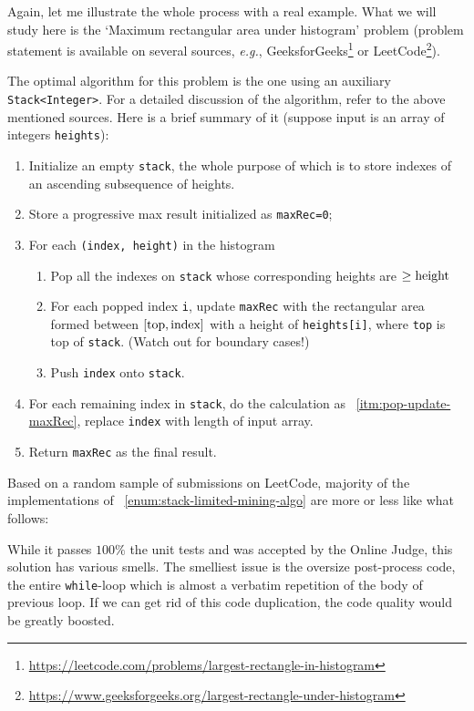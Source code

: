 \documentclass[oneside,11pt]{book}
\theoremstyle{definition}
\theoremstyle{remark}
\newcommand{\code}[1]{\mbox{\lstinline{#1}}}
\begin{document}
Again, let me illustrate the whole process with a real example.
What we will study here is the `Maximum rectangular area under
histogram' problem (problem statement is available on several sources, \textit{e.g.},
GeeksforGeeks\footnote{\url{https://leetcode.com/problems/largest-rectangle-in-histogram}}
or LeetCode\footnote{\url{https://www.geeksforgeeks.org/largest-rectangle-under-histogram}}).

The optimal algorithm for this problem is the one using an auxiliary \code{Stack<Integer>}.
For a detailed discussion of the algorithm, refer to the above mentioned sources.
Here is a brief summary of it (suppose input is an array of integers \code{heights}):
\begin{alisting}[H]
    \caption{\label{enum:stack-limited-mining-algo}Stack-based algorithm for
    the `maximum rectangular area under histogram' problem}
    \begin{enumerate}
        \item Initialize an empty \code{stack}, the whole purpose of
        which is to store indexes of an ascending subsequence of heights.
        \item Store a progressive max result initialized as \code{maxRec=0};
        \item For each \code{(index, height)} in the histogram
        \begin{enumerate}
            \item Pop all the indexes on \code{stack} whose corresponding heights are
            $\geq \mbox{\code{height}}$
            \item For each popped index \code{i}, update \code{maxRec} with the
            rectangular area formed between $[\mbox{\code{top}}, \mbox{\code{index}}]$
            with a height of \code{heights[i]}, where \code{top} is top of \code{stack}.
            (Watch out for boundary cases!) \label{itm:pop-update-maxRec}
            \item Push \code{index} onto \code{stack}.
        \end{enumerate}
        \item For each remaining index in \code{stack}, do the calculation
        as ~\ref{itm:pop-update-maxRec}, replace \code{index} with length of input array.
        \item Return \code{maxRec} as the final result.
    \end{enumerate}
\end{alisting}


Based on a random sample of submissions on LeetCode, majority of the implementations
of ~\autoref{enum:stack-limited-mining-algo} are more or less like what follows:

While it passes $100\%$ the unit tests and was accepted by the Online Judge, this
solution has various smells.
The smelliest issue is the oversize post-process code, the entire \code{while}-loop which
is almost a verbatim repetition of the body of previous loop.
If we can get rid of this code duplication, the code quality would be greatly boosted.
\end{document}
